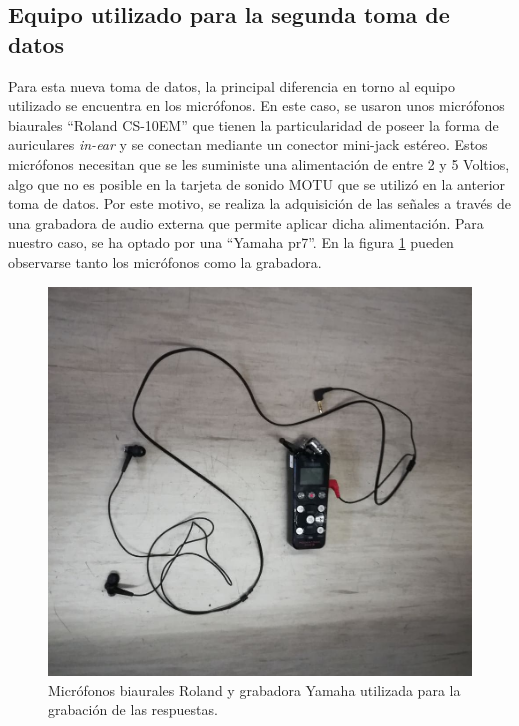 \documentclass[11pt,a4paper]{book}
\begin{document}
                
        \subsection{Equipo utilizado para la segunda toma de datos}
            Para esta nueva toma de datos, la principal diferencia en torno al equipo utilizado se encuentra en los micrófonos. En este caso, se usaron unos micrófonos biaurales ``Roland CS-10EM'' que tienen la particularidad de poseer la forma de auriculares \textit{in-ear} y se conectan mediante un conector mini-jack estéreo. Estos micrófonos necesitan que se les suministe una alimentación de entre 2 y 5 Voltios, algo que no es posible en la tarjeta de sonido MOTU que se utilizó en la anterior toma de datos. Por este motivo, se realiza la adquisición de las señales a través de una grabadora de audio externa que permite aplicar dicha alimentación. Para nuestro caso, se ha optado por una ``Yamaha pr7''. En la figura \ref{fig:microsBi} pueden observarse tanto los micrófonos como la grabadora.
                
            \begin{figure}[H]
                \includegraphics[scale=0.3]{../imagenes/MicroBi.jpg}
                \centering
                \caption{Micrófonos biaurales Roland y grabadora Yamaha utilizada para la grabación de las respuestas.}
                \label{fig:microsBi}
            \end{figure}
                
\end{document}
